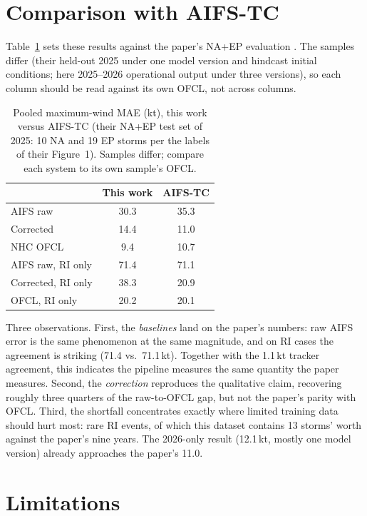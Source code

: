 \documentclass[11pt]{article}
\begin{document}
\section{Comparison with AIFS-TC}

Table~\ref{tab:paper} sets these results against the paper's NA+EP evaluation
\citep{allen2026aifstc}. The samples differ (their held-out 2025 under one model version and
hindcast initial conditions; here 2025--2026 operational output under three versions), so each
column should be read against its own OFCL, not across columns.

\begin{table}[t]
\centering
\caption{Pooled maximum-wind MAE (kt), this work versus AIFS-TC (their NA+EP test set of
2025: 10 NA and 19 EP storms per the labels of their Figure~1). Samples differ; compare each
system to its own sample's OFCL.}
\label{tab:paper}
\begin{tabular}{lcc}
\toprule
 & This work & AIFS-TC \\
\midrule
AIFS raw            & 30.3 & 35.3 \\
Corrected           & 14.4 & 11.0 \\
NHC OFCL            &  9.4 & 10.7 \\
AIFS raw, RI only   & 71.4 & 71.1 \\
Corrected, RI only  & 38.3 & 20.9 \\
OFCL, RI only       & 20.2 & 20.1 \\
\bottomrule
\end{tabular}
\end{table}

Three observations. First, the \emph{baselines} land on the paper's numbers: raw AIFS error is
the same phenomenon at the same magnitude, and on RI cases the agreement is striking (71.4 vs.\
71.1\,kt). Together with the 1.1\,kt tracker agreement, this indicates the pipeline measures the
same quantity the paper measures. Second, the \emph{correction} reproduces the qualitative claim,
recovering roughly three quarters of the raw-to-OFCL gap, but not the paper's parity with OFCL.
Third, the shortfall concentrates exactly where limited training data should hurt most: rare RI
events, of which this dataset contains 13 storms' worth against the paper's nine years. The
2026-only result (12.1\,kt, mostly one model version) already approaches the paper's 11.0.

\section{Limitations}
\end{document}
